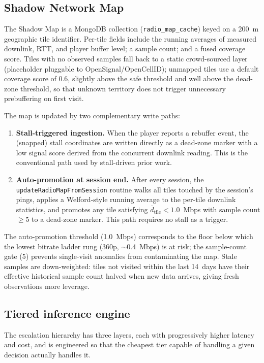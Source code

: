 \documentclass[conference]{IEEEtran}
\begin{document}
\subsection{Shadow Network Map}
\label{sec:shadow}
The Shadow Map is a MongoDB collection (\texttt{radio\_map\_cache}) keyed
on a 200~m geographic tile identifier. Per-tile fields include the
running averages of measured downlink, RTT, and player buffer level; a
sample count; and a fused coverage score. Tiles with no observed samples
fall back to a static crowd-sourced layer (placeholder pluggable to
OpenSignal/OpenCellID); unmapped tiles use a default coverage score of
$0.6$, slightly above the safe threshold and well above the dead-zone
threshold, so that unknown territory does not trigger unnecessary
prebuffering on first visit.

The map is updated by two complementary write paths:
\begin{enumerate}
  \item \textbf{Stall-triggered ingestion.} When the player reports a
        rebuffer event, the (snapped) stall coordinates are written
        directly as a dead-zone marker with a low signal score derived
        from the concurrent downlink reading. This is the conventional
        path used by stall-driven prior work.
  \item \textbf{Auto-promotion at session end.} After every session, the
        \texttt{updateRadioMapFromSession} routine walks all tiles
        touched by the session's pings, applies a Welford-style running
        average to the per-tile downlink statistics, and promotes any
        tile satisfying $\bar{d}_{\text{tile}} < 1.0$~Mbps with sample
        count $\geq 5$ to a dead-zone marker. This path requires no
        stall as a trigger.
\end{enumerate}
The auto-promotion threshold (1.0~Mbps) corresponds to the floor below
which the lowest bitrate ladder rung (360p, $\sim$0.4~Mbps) is at risk;
the sample-count gate (5) prevents single-visit anomalies from
contaminating the map. Stale samples are down-weighted: tiles not visited
within the last 14~days have their effective historical sample count
halved when new data arrives, giving fresh observations more leverage.

\subsection{Tiered inference engine}
\label{sec:tiered}
The escalation hierarchy has three layers, each with progressively higher
latency and cost, and is engineered so that the cheapest tier capable of
handling a given decision actually handles it.
\end{document}
